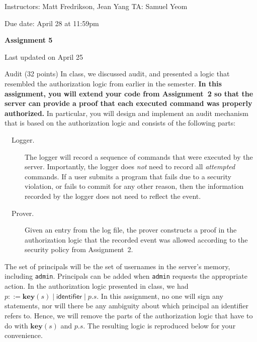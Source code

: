 \documentclass[11pt]{article}
\newcommand*{\stuname}{}
\newcommand*{\assignmentnumb}{5}
\newcommand{\key}{\ensuremath{\mathbf{key}}\xspace}
\begin{document}
\centerline{Instructors: Matt Fredrikson, Jean Yang \hfill TA: Samuel Yeom} 
\vspace{0.5ex}
Due date: April 28 at 11:59pm \\
\vspace{1.5ex}
\centerline{\Large\bf Assignment \assignmentnumb}
\vspace{0.5ex}
\centerline{\Large\bf \stuname}
\parbox{\textwidth}{\hfill \color{red} Last updated on April 25}

\begin{problem}{Audit (32 points)}
In class, we discussed audit, and presented a logic that resembled the authorization logic from earlier in the semester. \textbf{In this assignment, you will extend your code from Assignment~2 so that the server can provide a proof that each executed command was properly authorized.} In particular, you will design and implement an audit mechanism that is based on the authorization logic and consists of the following parts:
\begin{description}
\item[\ \ Logger.] The logger will record a sequence of commands that were executed by the server. Importantly, the logger does \emph{not} need to record all \emph{attempted} commands. If a user submits a program that fails due to a security violation, or fails to commit for any other reason, then the information recorded by the logger does not need to reflect the event.
\item[\ \ Prover.] Given an entry from the log file, the prover constructs a proof in the authorization logic that the recorded event was allowed according to the security policy from Assignment~2.
\end{description}

The set of principals will be the set of usernames in the server's memory, including \texttt{admin}. Principals can be added when \texttt{admin} requests the appropriate action. In the authorization logic presented in class, we had $p ::= \key(s) \mid \mathsf{identifier} \mid p.s$. In this assignment, no one will sign any statements, nor will there be any ambiguity about which principal an identifier refers to. Hence, we will remove the parts of the authorization logic that have to do with $\key(s)$ and $p.s$. The resulting logic is reproduced below for your convenience.


\end{problem}
\end{document}
